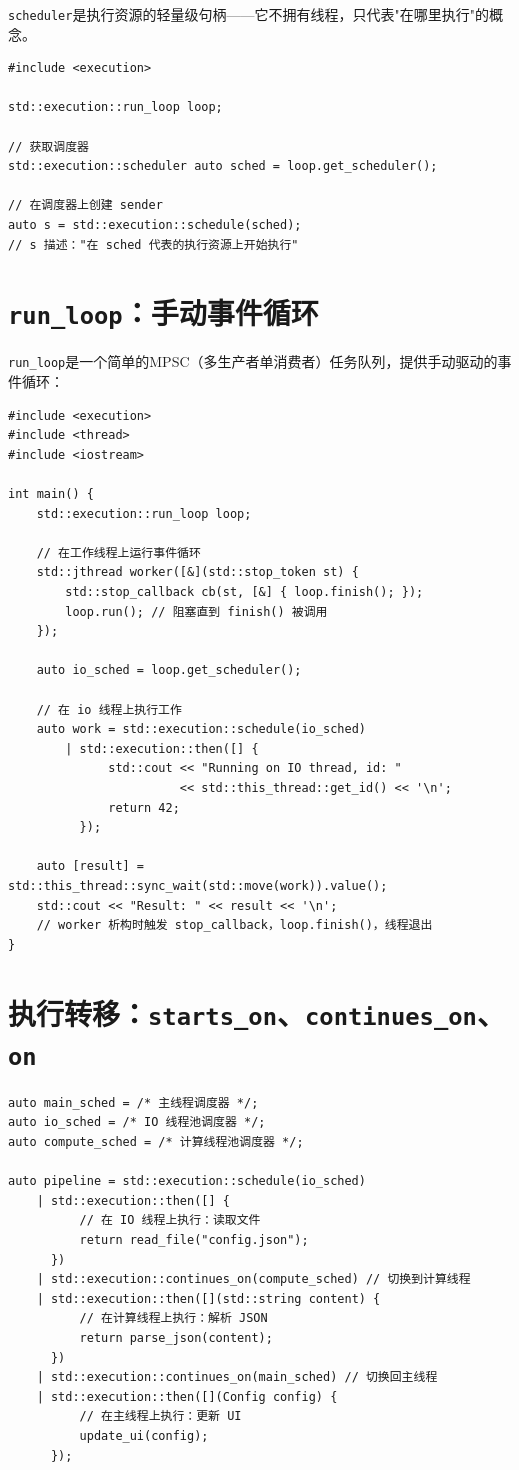 \documentclass[12pt,a4paper,fontset=fandol]{ctexbook}
\begin{document}
\texttt{scheduler}是执行资源的轻量级句柄——它不拥有线程，只代表"在哪里执行"的概念。

\begin{lstlisting}
#include <execution>

std::execution::run_loop loop;

// 获取调度器
std::execution::scheduler auto sched = loop.get_scheduler();

// 在调度器上创建 sender
auto s = std::execution::schedule(sched);
// s 描述："在 sched 代表的执行资源上开始执行"
\end{lstlisting}

\section{\texttt{run\_loop}：手动事件循环}

\texttt{run\_loop}是一个简单的MPSC（多生产者单消费者）任务队列，提供手动驱动的事件循环：

\begin{lstlisting}
#include <execution>
#include <thread>
#include <iostream>

int main() {
    std::execution::run_loop loop;

    // 在工作线程上运行事件循环
    std::jthread worker([&](std::stop_token st) {
        std::stop_callback cb(st, [&] { loop.finish(); });
        loop.run(); // 阻塞直到 finish() 被调用
    });

    auto io_sched = loop.get_scheduler();

    // 在 io 线程上执行工作
    auto work = std::execution::schedule(io_sched)
        | std::execution::then([] {
              std::cout << "Running on IO thread, id: "
                        << std::this_thread::get_id() << '\n';
              return 42;
          });

    auto [result] = std::this_thread::sync_wait(std::move(work)).value();
    std::cout << "Result: " << result << '\n';
    // worker 析构时触发 stop_callback，loop.finish()，线程退出
}
\end{lstlisting}

\section{执行转移：\texttt{starts\_on}、\texttt{continues\_on}、\texttt{on}}

\begin{lstlisting}
auto main_sched = /* 主线程调度器 */;
auto io_sched = /* IO 线程池调度器 */;
auto compute_sched = /* 计算线程池调度器 */;

auto pipeline = std::execution::schedule(io_sched)
    | std::execution::then([] {
          // 在 IO 线程上执行：读取文件
          return read_file("config.json");
      })
    | std::execution::continues_on(compute_sched) // 切换到计算线程
    | std::execution::then([](std::string content) {
          // 在计算线程上执行：解析 JSON
          return parse_json(content);
      })
    | std::execution::continues_on(main_sched) // 切换回主线程
    | std::execution::then([](Config config) {
          // 在主线程上执行：更新 UI
          update_ui(config);
      });
\end{lstlisting}
\end{document}
